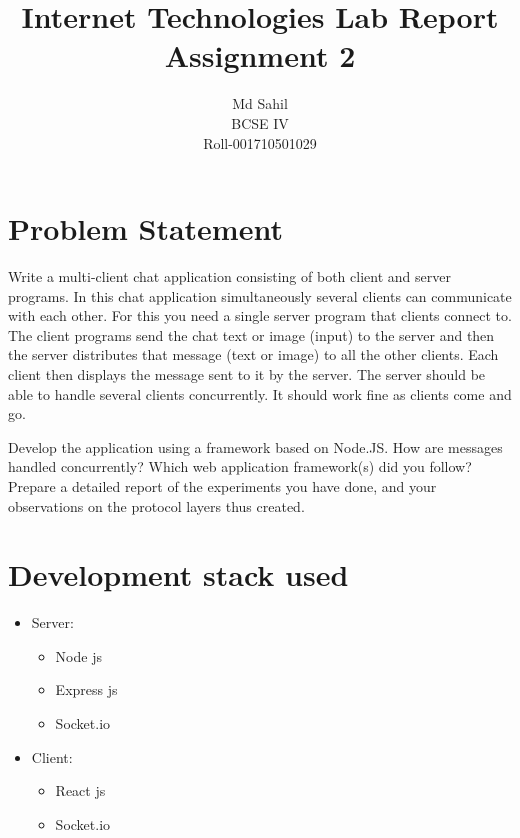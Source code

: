 \documentclass[titlepage]{article}
\title{Internet Technologies Lab Report\\Assignment 2}
\author{Md Sahil\\BCSE IV\\Roll-001710501029}
\date{}
\begin{document}
    {\maketitle}

    \section{Problem Statement}
    Write a multi-client chat application consisting of both client and server programs.
    In this chat application simultaneously several clients can communicate with each other.
    For this you need a single server program that clients connect to.
    The client programs send the chat text or image (input) to the server and then the server
    distributes that message (text or image) to all the other clients.
    Each client then displays the message sent to it by the server.
    The server should be able to handle several clients concurrently.
    It should work fine as clients come and go.
    

    Develop the application using a framework based on Node.JS.\@
    How are messages handled concurrently? Which web application framework(s) did you follow?  
    Prepare a detailed report of the experiments you have done, and your observations on the protocol layers thus created.  

    \section{Development stack used}
    \begin{itemize}
        \item Server:
            \begin{itemize}
                \item Node js
                \item Express js
                \item Socket.io
            \end{itemize}
        \item Client:
            \begin{itemize}
                \item React js
                \item Socket.io
            \end{itemize}
    \end{itemize}
\end{document}
